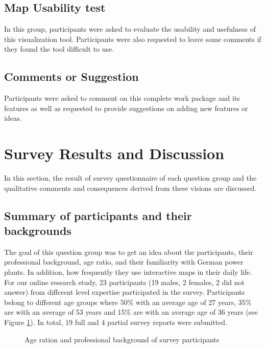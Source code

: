 \subsection*{Map Usability test}
\label{sssec:MUtest}

In this group, participants were asked to evaluate the usability and usefulness of this visualization tool. Participants were also requested to leave some comments if they found the tool difficult to use. 

\subsection*{Comments or Suggestion}
\label{sssec:cORS}

Participants were asked to comment on this complete work package and its features as well as requested to provide suggestions on adding new features or ideas.  

\section{Survey Results and Discussion}

In this section, the result of survey questionnaire of each question group and the qualitative comments and consequences derived from these visions are discussed. 

\subsection{Summary of participants and their backgrounds}

The goal of this question group was to get an idea about the participants, their professional background, age ratio, and their familiarity with German power plants. In addition, how frequently they use interactive maps in their daily life. For our online research study, 23 participants (19 males, 2 females, 2 did not answer) from different level expertise participated in the survey. Participants belong to different age groups where 50\% with an average age of 27 years, 35\% are with an average of 53 years and 15\% are with an average age of 36 years (see Figure \ref{fig:participantBack}). In total, 19 full and 4 partial survey reports were submitted. 

\begin{figure} [H]
  \begin{center}
\hfill
{}
\hfill
\caption{Age ration and professional background of survey participants}
\label{fig:participantBack}
\end{center}
\end{figure}

